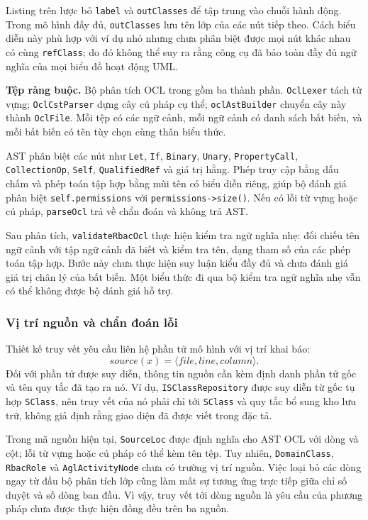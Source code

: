 Listing trên lược bỏ \texttt{label} và \texttt{outClasses} để tập trung vào chuỗi hành động. Trong mô hình đầy đủ, \texttt{outClasses} lưu tên lớp của các nút tiếp theo. Cách biểu diễn này phù hợp với ví dụ nhỏ nhưng chưa phân biệt được mọi nút khác nhau có cùng \texttt{refClass}; do đó không thể suy ra rằng công cụ đã bảo toàn đầy đủ ngữ nghĩa của mọi biểu đồ hoạt động UML.

\textbf{Tệp ràng buộc.} Bộ phân tích OCL trong  gồm ba thành phần. \texttt{OclLexer} tách từ vựng; \texttt{OclCstParser} dựng cây cú pháp cụ thể; \texttt{oclAstBuilder} chuyển cây này thành \texttt{OclFile}. Mỗi tệp có các ngữ cảnh, mỗi ngữ cảnh có danh sách bất biến, và mỗi bất biến có tên tùy chọn cùng thân biểu thức.

AST phân biệt các nút như \texttt{Let}, \texttt{If}, \texttt{Binary}, \texttt{Unary}, \texttt{PropertyCall}, \texttt{CollectionOp}, \texttt{Self}, \texttt{QualifiedRef} và giá trị hằng. Phép truy cập bằng dấu chấm và phép toán tập hợp bằng mũi tên có biểu diễn riêng, giúp bộ đánh giá phân biệt \texttt{self.permissions} với \texttt{permissions->size()}. Nếu có lỗi từ vựng hoặc cú pháp, \texttt{parseOcl} trả về chẩn đoán và không trả AST.

Sau phân tích, \texttt{validateRbacOcl} thực hiện kiểm tra ngữ nghĩa nhẹ: đối chiếu tên ngữ cảnh với tập ngữ cảnh đã biết và kiểm tra tên, dạng tham số của các phép toán tập hợp. Bước này chưa thực hiện suy luận kiểu đầy đủ và chưa đánh giá giá trị chân lý của bất biến. Một biểu thức đi qua bộ kiểm tra ngữ nghĩa nhẹ vẫn có thể không được bộ đánh giá hỗ trợ.

\subsubsection{Vị trí nguồn và chẩn đoán lỗi}

Thiết kế truy vết yêu cầu liên hệ phần tử mô hình với vị trí khai báo:
\[
\mathit{source}(x)=\langle\mathit{file},\mathit{line},\mathit{column}\rangle.
\]
Đối với phần tử được suy diễn, thông tin nguồn cần kèm định danh phần tử gốc và tên quy tắc đã tạo ra nó. Ví dụ, \texttt{ISClassRepository} được suy diễn từ gốc tụ hợp \texttt{SClass}, nên truy vết của nó phải chỉ tới \texttt{SClass} và quy tắc bổ sung kho lưu trữ, không giả định rằng giao diện đã được viết trong đặc tả.

Trong mã nguồn hiện tại, \texttt{SourceLoc} được định nghĩa cho AST OCL với dòng và cột; lỗi từ vựng hoặc cú pháp có thể kèm tên tệp. Tuy nhiên, \texttt{DomainClass}, \texttt{RbacRole} và \texttt{AglActivityNode} chưa có trường vị trí nguồn. Việc loại bỏ các dòng ngay từ đầu bộ phân tích lớp cũng làm mất sự tương ứng trực tiếp giữa chỉ số duyệt và số dòng ban đầu. Vì vậy, truy vết tới dòng nguồn là yêu cầu của phương pháp chưa được thực hiện đồng đều trên ba nguồn.

